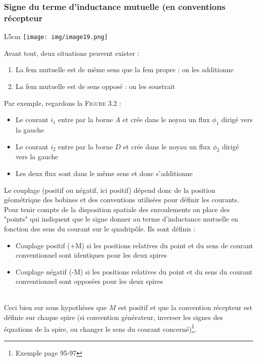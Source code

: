 \documentclass	[11pt, a4paper, openany]{book}
\begin{document}
\subsubsection{Signe du terme d'inductance mutuelle (en conventions récepteur}
\begin{wrapfigure}[8]{L}{5cm}
\texttt{[image: img/image19.png]}
\end{wrapfigure}
Avant tout, deux situations peuvent exister : 
\begin{enumerate}
\item La fem mutuelle est de même sens que la fem propre : on les additionne
\item La fem mutuelle est de sens opposé : on les soustrait
\end{enumerate}
Par exemple, regardons la \textsc{Figure 3.2} :
\begin{itemize}
\item Le courant $i_1$ entre par la borne $A$ et crée dans le noyau un flux $\phi_1$ dirigé vers la gauche
\item Le courant $i_2$ entre par la borne $D$ et crée dans le noyau un flux $\phi_2$ dirigé vers la gauche
\item Les deux flux sont dans le même sens et donc s'additionne
\end{itemize}
Le couplage (positif ou négatif, ici positif) dépend donc de la position géométrique des bobines et des conventions utilisées pour définir les courants.\\

Pour tenir compte de la disposition spatiale des enroulements on place des "points" qui indiquent que le signe donner au terme d'inductance mutuelle en fonction des sens du courant sur le quadripôle. Ils sont définis :
\begin{itemize}
\item Couplage positif (+M) si les positions relatives du point et du sens de courant conventionnel sont identiques pour les deux spires
\item Couplage négatif (-M) si les positions relatives du point et du sens du courant conventionnel sont opposées pour les deux spires
\end{itemize}\ \\

Ceci bien sur sous hypothèses que $M$ est positif et que la convention récepteur est définie sur chaque spire (si convention générateur, inverser les signes des équations de la spire, ou changer le sens du courant concerné)\footnote{Exemple page 95-97}.
\end{document}
